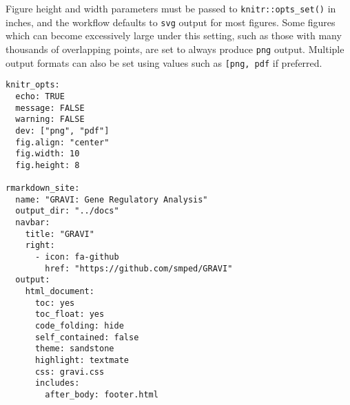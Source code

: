 \documentclass[
]{book}
\begin{document}
Figure height and width parameters must be passed to \texttt{knitr::opts\_set()} in inches, and the workflow defaults to \texttt{svg} output for most figures.
Some figures which can become excessively large under this setting, such as those with many thousands of overlapping points, are set to always produce \texttt{png} output.
Multiple output formats can also be set using values such as \texttt{{[}\textquotesingle{}png\textquotesingle{},\ \textquotesingle{}pdf\textquotesingle{}{]}} if preferred.

\begin{verbatim}
knitr_opts:
  echo: TRUE
  message: FALSE
  warning: FALSE
  dev: ["png", "pdf"]
  fig.align: "center"
  fig.width: 10
  fig.height: 8

rmarkdown_site:
  name: "GRAVI: Gene Regulatory Analysis"
  output_dir: "../docs"
  navbar:
    title: "GRAVI"
    right:
      - icon: fa-github
        href: "https://github.com/smped/GRAVI"
  output:
    html_document:
      toc: yes
      toc_float: yes
      code_folding: hide
      self_contained: false
      theme: sandstone
      highlight: textmate
      css: gravi.css
      includes:
        after_body: footer.html
\end{verbatim}

  
\end{document}
